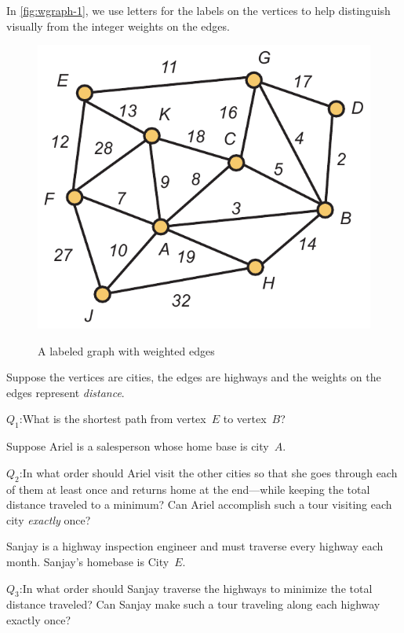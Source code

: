 \begin{example}
In \autoref{fig:wgraph-1}, we use letters for the labels on the
vertices to help distinguish visually from the integer weights
on the edges. 

\begin{figure}
\begin{center}
\includegraphics[scale=.6]{intro-figs/3012-fig12}\\
\end{center}
\caption{A labeled graph with weighted edges}
\label{fig:wgraph-1}
\end{figure}

Suppose the vertices are cities, the edges are highways
and the weights on the edges represent \textit{distance}.

\medskip
\noindent
$Q_1$:\quad  What is the shortest path from vertex~$E$ to vertex~$B$?

\medskip
Suppose Ariel is a salesperson whose home base is city~$A$. 

\medskip
\noindent
$Q_2$:\quad In what order should Ariel visit the other cities so that she
goes through each of them at least once and returns home
at the end---while keeping the total distance traveled to a minimum?  
Can Ariel accomplish such a tour visiting
each city \textit{exactly} once? 

\medskip
Sanjay is a highway inspection engineer and must traverse every
highway each month.  Sanjay's homebase is City~$E$.  

\medskip
\noindent
$Q_3$:\quad In what
order should Sanjay traverse the highways to minimize the total
distance traveled?  Can Sanjay make such a tour traveling
along each highway exactly once?
\end{example}

